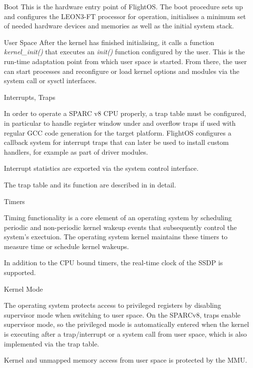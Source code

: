 %
{Boot}{%
This is the hardware entry point of FlightOS. The boot procedure sets up and
configures the \gls{LEON3-FT} processor for operation, initialises a minimum set of 
needed hardware devices and memories as well as the initial system stack.
}%
{}{}



{User Space}{%
After the kernel has finished initialising, it calls a function
\mbox{\emph{kernel\_init()}}
that executes an \emph{init()} function configured by the user. This is the
run-time adaptation point from which user space is started. From there, the user
can start processes and reconfigure or load kernel options and modules via the
system call or sysctl interfaces.
}%
{}{}



%
{Interrupts, Traps}
{In order to operate a \gls{SPARC} v8 \gls{CPU} properly, a trap table must be
configured, in particular to handle register window under and overflow traps if
used with regular \gls{GCC} code generation for the target platform.
FlightOS configures a callback system for interrupt traps that can later be used
to install custom handlers, for example as part of driver modules.\newline

Interrupt statistics are exported via the system control interface.
}%
{}%
{The trap table and its function are described in \cite{SPARCv8} in detail.}



%
{Timers}{%
Timing functionality is a core element of an operating system by scheduling
periodic and non-periodic kernel wakeup events that subsequently control the
system's exectuion. The operating system kernel maintains these timers to
measure time or schedule kernel wakeups.

In addition to the \gls{CPU} bound timers, the real-time clock of the \gls{SSDP}
is supported.
}%
{}{}


%
{Kernel Mode}{%
The operating system protects access to privileged registers by disabling
supervisor mode when switching to user space. On the \gls{SPARC}v8, traps enable
supervisor mode, so the privileged mode is automatically entered when the kernel
is executing after a trap/interrupt or a system call from user space, which is
also implemented via the trap table.\newline

Kernel and unmapped memory access from user space is protected by the \gls{MMU}.
}%
{}{}


